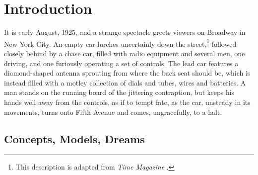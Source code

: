 \chapter{Introduction}
\label{chap:0}



It is early August, 1925, and a strange spectacle greets viewers on
Broadway in New York City. An empty car lurches uncertainly down the
street,\footnote{This description is adapted from \emph{Time
 Magazine} \cite{ScienceRadio}.} followed closely behind by a
chase car, filled with radio equipment and several men, one driving,
and one furiously operating a set of controls. The lead car features a
diamond-shaped antenna sprouting from where the back seat should be,
which is instead filled with a motley collection of dials and tubes,
wires and batteries. A man stands on the running board of the
jittering contraption, but keeps his
hands well away from the controls, as if to tempt fate, as the car,
unsteady in its movements, turns onto Fifth Avenue and comes,
ungracefully, to a halt.

\section{Concepts, Models, Dreams}

